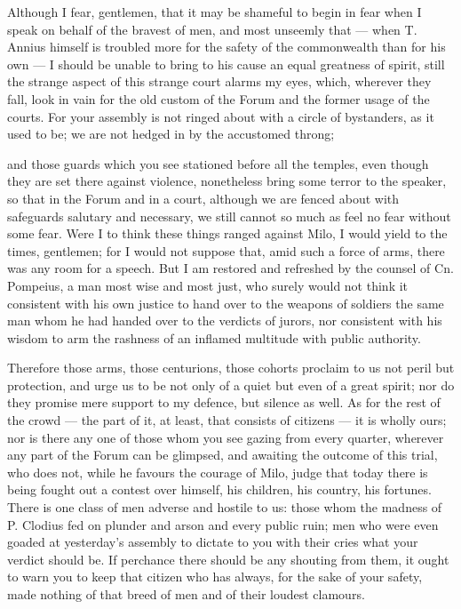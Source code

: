 
 Although I fear, gentlemen, that it may be shameful to begin in fear when I speak on behalf of the bravest of men, and most unseemly that --- when T. Annius himself is troubled more for the safety of the commonwealth than for his own --- I should be unable to bring to his cause an equal greatness of spirit, still the strange aspect of this strange court alarms my eyes, which, wherever they fall, look in vain for the old custom of the Forum and the former usage of the courts. For your assembly is not ringed about with a circle of bystanders, as it used to be; we are not hedged in by the accustomed throng;

 and those guards which you see stationed before all the temples, even though they are set there against violence, nonetheless bring some terror to the speaker, so that in the Forum and in a court, although we are fenced about with safeguards salutary and necessary, we still cannot so much as feel no fear without some fear. Were I to think these things ranged against Milo, I would yield to the times, gentlemen; for I would not suppose that, amid such a force of arms, there was any room for a speech. But I am restored and refreshed by the counsel of Cn. Pompeius, a man most wise and most just, who surely would not think it consistent with his own justice to hand over to the weapons of soldiers the same man whom he had handed over to the verdicts of jurors, nor consistent with his wisdom to arm the rashness of an inflamed multitude with public authority.

 Therefore those arms, those centurions, those cohorts proclaim to us not peril but protection, and urge us to be not only of a quiet but even of a great spirit; nor do they promise mere support to my defence, but silence as well. As for the rest of the crowd --- the part of it, at least, that consists of citizens --- it is wholly ours; nor is there any one of those whom you see gazing from every quarter, wherever any part of the Forum can be glimpsed, and awaiting the outcome of this trial, who does not, while he favours the courage of Milo, judge that today there is being fought out a contest over himself, his children, his country, his fortunes. There is one class of men adverse and hostile to us: those whom the madness of P. Clodius fed on plunder and arson and every public ruin; men who were even goaded at yesterday's assembly to dictate to you with their cries what your verdict should be. If perchance there should be any shouting from them, it ought to warn you to keep that citizen who has always, for the sake of your safety, made nothing of that breed of men and of their loudest clamours.

